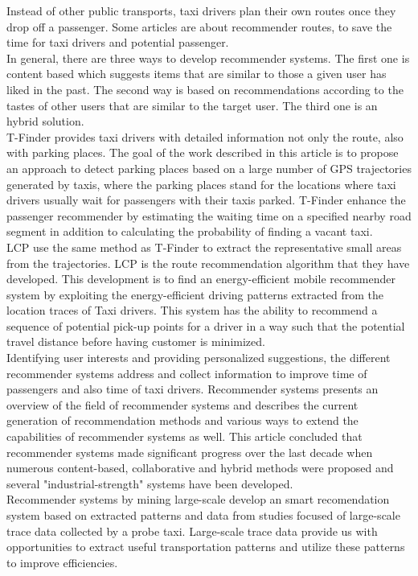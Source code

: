 \documentclass[11pt,conference,a4paper,twocolumns,romanappendices]{IEEEtran}
\begin{document}
Instead of other public transports, taxi drivers plan their own routes once they drop off a passenger. Some articles are about recommender routes, to save the time for taxi drivers and potential passenger. \\
In general, there are three ways to develop recommender systems. The first one is content based which suggests items that are similar to those a given user has liked in the past. The second way is based on recommendations  according to the tastes of other users that are similar to the target user. The third one is an hybrid solution. \\
T-Finder provides taxi drivers with detailed information not only the route, also with parking places. \cite{tf} The goal of the work described in this article is to propose an approach to detect parking places based on a large number of GPS trajectories generated by taxis, where the parking places stand for the locations where taxi drivers usually wait for passengers with their taxis parked. T-Finder enhance the passenger recommender by estimating the waiting time on a specified nearby road segment in addition to calculating the probability of finding a vacant taxi. \\
LCP \cite{eff} use the same method as T-Finder \cite{tf} to extract the representative small areas from the trajectories. LCP is the route recommendation algorithm that they have developed. This development is to find an energy-efficient mobile recommender system by exploiting the energy-efficient driving patterns extracted from the location traces of Taxi drivers. This system has the ability to recommend a sequence of potential pick-up points for a driver in a way such that the potential travel distance before having customer is minimized. \\
Identifying user interests and providing personalized suggestions, the different recommender systems address and collect information to improve time of passengers and also time of taxi drivers. Recommender systems \cite{tow} presents an overview of the field of recommender systems and describes the current generation of recommendation methods and various ways to extend the capabilities of recommender systems as well. This article concluded that recommender systems made significant progress over the last decade when numerous content-based, collaborative and hybrid methods were proposed and several "industrial-strength" systems have been developed. \\
Recommender systems by mining large-scale \cite{min1,min2} develop an smart recomendation system based on extracted patterns and data from studies focused of large-scale trace data collected by a probe taxi. Large-scale trace data provide us with opportunities to extract useful transportation patterns and utilize these patterns to improve efficiencies.
\end{document}
